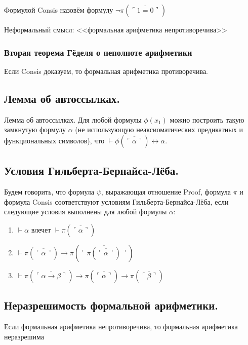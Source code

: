 \documentclass[10pt,a4paper,oneside]{article}
\begin{document}
 Формулой Consis назовём формулу
$\neg \pi(\overline{\ulcorner 1=0 \urcorner})$

\noindent Неформальный смысл: <<формальная арифметика непротиворечива>>

\subsubsection{Вторая теорема Гёделя о неполноте арифметики}
 Если Consis доказуем, то формальная арифметика противоречива.

\subsection{Лемма об автоссылках.}
 Лемма об автоссылках. Для любой формулы $\phi(x_1)$ можно построить 
такую замкнутую формулу $\alpha$ (не использующую неаксиоматических предикатных
и функциональных символов), что $\vdash \phi(\overline{\ulcorner\alpha\urcorner}) \leftrightarrow \alpha$.

\subsection{Условия Гильберта-Бернайса-Лёба.}
Будем говорить, что формула $\psi$, выражающая отношение Proof, 
формула $\pi$ и формула Consis соответствуют
условиям Гильберта-Бернайса-Лёба, если следующие условия выполнены для любой формулы $\alpha$:

\begin{enumerate}
\item $\vdash \alpha$ влечет $\vdash \pi(\overline{\ulcorner\alpha\urcorner})$
\item $\vdash \pi (\overline{\ulcorner\alpha\urcorner}) \rightarrow \pi(\overline{\ulcorner\pi(\overline{\ulcorner\alpha\urcorner})\urcorner})$
\item $\vdash \pi (\overline{\ulcorner\alpha\rightarrow \beta\urcorner}) \rightarrow \pi(\overline{\ulcorner\alpha\urcorner}) \rightarrow \pi(\overline{\ulcorner\beta\urcorner})$
\end{enumerate}


\subsection{Неразрешимость формальной арифметики.}
Если формальная арифметика непротиворечива, то формальная арифметика неразрешима
\end{document}
